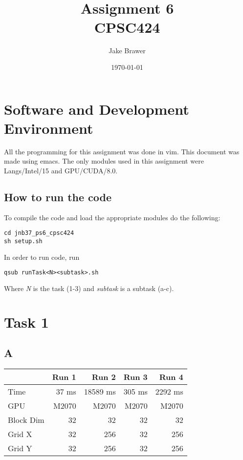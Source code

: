 \documentclass[11pt]{article}
\author{Jake Brawer}
\date{\today}
\title{Assignment 6\\\medskip
\large CPSC424}
\begin{document}
\maketitle

\section{Software and Development Environment}
\label{sec:org1a76bb8}

All the programming for this assignment was done in vim. This document was made using emacs. The only modules used in this assignment were Langs/Intel/15 and GPU/CUDA/8.0.

\subsection{How to run the code}
\label{sec:org96bdbe5}

To compile the code and load the appropriate modules do the following:
\begin{verbatim}
cd jnb37_ps6_cpsc424
sh setup.sh
\end{verbatim}

In order to run code, run
\begin{verbatim}
qsub runTask<N><subtask>.sh
\end{verbatim}
Where \emph{N} is the task (1-3) and \emph{subtask} is a subtask (a-c).

\section{Task 1}
\label{sec:orgb32f4b8}
\subsection{A}
\label{sec:org5a1cf7d}

\begin{center}
\begin{tabular}{lrrrr}
 & Run 1 & Run 2 & Run 3 & Run 4\\
\hline
Time & 37 ms & 18589 ms & 305 ms & 2292 ms\\
GPU & M2070 & M2070 & M2070 & M2070\\
Block Dim & 32 & 32 & 32 & 32\\
Grid X & 32 & 256 & 32 & 256\\
Grid Y & 32 & 256 & 32 & 256\\
\end{tabular}
\end{center}
\end{document}
